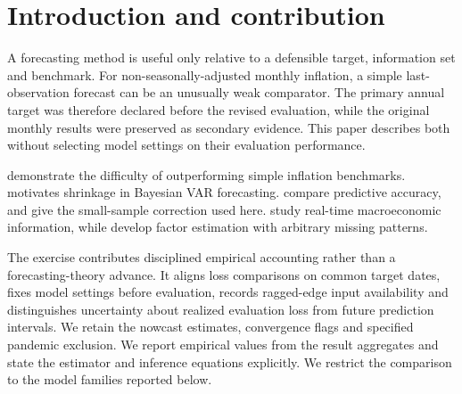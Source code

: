 \begin{abstract}
We ask whether fixed statistical models improve inflation forecasts over simple benchmarks and whether monthly information improves German GDP nowcasts. We evaluate expanding-window year-on-year forecasts against random-walk and Atkeson--Ohanian-style benchmarks and compare bridge, unrestricted MIDAS and factor nowcasts. Euro-area core BVAR relative RMSE is \CoreRatio{}, with interval [\CoreLow{}, \CoreHigh{}]; the headline ensemble ratio is \HeadlineRatio{}. The full-sample month-three factor nowcast has relative RMSE \NowcastRatio{} against the bridge. The earlier core gain does not survive the assumed publication calendar; the headline ensemble also has a ratio above one. Nowcast rankings remain sensitive to pandemic quarters. Revised data, simulated publication delays and conditional loss inference limit operational interpretation.
\end{abstract}
\section{Introduction and contribution}
A forecasting method is useful only relative to a defensible target, information set and benchmark. For non-seasonally-adjusted monthly inflation, a simple last-observation forecast can be an unusually weak comparator. The primary annual target was therefore declared before the revised evaluation, while the original monthly results were preserved as secondary evidence. This paper describes both without selecting model settings on their evaluation performance.

\citet{ao} demonstrate the difficulty of outperforming simple inflation benchmarks. \citet{litterman} motivates shrinkage in Bayesian VAR forecasting. \citet{dm} compare predictive accuracy, and \citet{hln} give the small-sample correction used here. \citet{nowcast} study real-time macroeconomic information, while \citet{bm} develop factor estimation with arbitrary missing patterns.

The exercise contributes disciplined empirical accounting rather than a forecasting-theory advance. It aligns loss comparisons on common target dates, fixes model settings before evaluation, records ragged-edge input availability and distinguishes uncertainty about realized evaluation loss from future prediction intervals. We retain the nowcast estimates, convergence flags and specified pandemic exclusion. We report empirical values from the result aggregates and state the estimator and inference equations explicitly. We restrict the comparison to the model families reported below.

